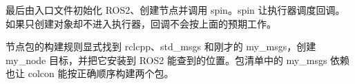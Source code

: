\begin{example}
最后由入口文件初始化 ROS2、创建节点并调用 spin。spin 让执行器调度回调。如果只创建对象却不进入执行器，回调不会按上面的预期工作。
\par\medskip\noindent\begin{minipage}{\linewidth}

\end{minipage}\par\smallskip

节点包的构建规则显式找到 rclcpp、std\_msgs 和刚才的 my\_msgs，创建 my\_node 目标，并把它安装到 ROS2 能查到的位置。包清单中的 my\_msgs 依赖也让 colcon 能按正确顺序构建两个包。
\par\medskip\noindent\begin{minipage}{\linewidth}

\end{minipage}\par\smallskip
{}
\par\medskip\noindent\begin{minipage}{\linewidth}

\end{minipage}\par\smallskip

\end{example}

